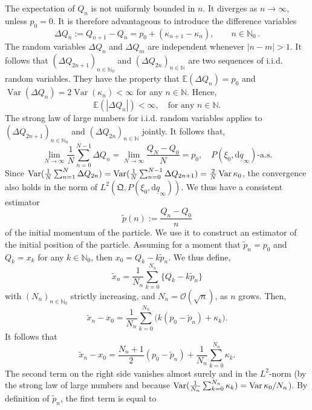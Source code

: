 \documentclass[11pt]{article}
\begin{document}
The expectation of $Q_n$ is not uniformly bounded in $n$. It diverges as $n\rightarrow \infty$, unless $p_0 =0$. 
It is therefore advantageous to introduce the difference variables 
\begin{equation}\label{diff variiables}
\Delta Q_n := Q_{n+1}-Q_{n}=p_0+(\kappa_{n+1}-\kappa_n),\qquad n\in \mathbb{N}_0\,.
\end{equation}
The random variables $\Delta Q_n$ and $\Delta Q_m$ are independent whenever $|n-m|>1$. It follows that 
$(\Delta Q_{2n+1})_{n\in \mathbb N_0}$ and $(\Delta Q_{2n})_{n\in \mathbb N}$ are two sequences of 
i.i.d. random variables. They have the property that $\mathbb E(\Delta Q_n)=p_0$ and 
$\operatorname{Var}(\Delta Q_n)=2\operatorname{Var}(\kappa_n)<\infty$ for any $n\in \mathbb N$. Hence,
$$\mathbb E(|\Delta Q_n|)<\infty,\quad \mbox{for any }n\in \mathbb N.$$
The strong law of large numbers for i.i.d. random variables applies to $(\Delta Q_{2n+1})_{n\in \mathbb N_0}$ 
and $(\Delta Q_{2n})_{n\in \mathbb N}$ jointly. It follows that,
\begin{equation}\label{eq:free_part_estim_momentum}
\lim_{N\to\infty}\frac{1}{N} \sum_{n=0}^{N-1} \Delta Q_n =\lim_{N\to\infty} \frac{Q_N-Q_0}{N}= p_0, \quad P(\xi_0,\text{d}\underline{q}_\infty)\text{-a.s.}
\end{equation}
Since $\operatornamewithlimits{Var}(\frac{1}{N} \sum_{n=1}^{N} \Delta Q_{2n})=\operatornamewithlimits{Var}(\frac{1}{N} \sum_{n=0}^{N-1} \Delta Q_{2n+1})=\frac{2}{N}\operatornamewithlimits{Var}\kappa_0$, the convergence 
also holds in the norm of $L^2(\mathfrak{Q}, P(\xi_0,\text{d}\underline{q}_\infty))$.
We thus have a consistent estimator 
$$\tilde p(n):=\frac{Q_n-Q_0}{n}$$
of the initial momentum of the particle. We use it to construct an estimator of the initial position of the particle. Assuming for a moment that $\tilde p_n=p_0$ and $Q_k=x_k$ for any $k\in \mathbb N_0$, then $x_0=Q_k-k\tilde p_n$. We thus define,
$$\tilde x_n=\frac1{N_n}\sum_{k=0}^{N_n} \big\{Q_k-k\tilde p_n \big\}$$
with $(N_n)_{n\in \mathbb{N}_0}$ strictly increasing, and $N_n=\mathcal{O}(\sqrt{n})$, as $n$ grows. Then,
$$\tilde x_n-x_0=\frac1{N_n}\sum_{k=0}^{N_n}\big(k(p_0-\tilde p_n) +\kappa_k\big).$$
It follows that
$$\tilde x_n-x_0=\frac{N_n+1}2(p_0-\tilde p_n) + \frac1{N_n}\sum_{k=0}^{N_n}\kappa_k.$$
The second term on the right side vanishes almost surely and in the $L^2$-norm (by the strong law of large numbers 
and because 
$\operatornamewithlimits{Var}(\frac1{N_n}\sum_{k=0}^{N_n}\kappa_k)=\operatornamewithlimits{Var}\kappa_0/N_n$). 
By definition of $\tilde p_n$, the first term is equal to
\end{document}

